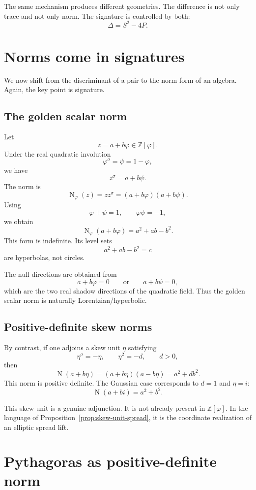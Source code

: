 \documentclass[11pt]{article}
\newcommand{\Nm}{\operatorname{N}}
\newcommand{\sig}{\sigma}
\newcommand{\ph}{\varphi}
\newcommand{\ps}{\psi}
\newcommand{\Z}{\mathbb{Z}}
\begin{document}
The same mechanism produces different geometries.  The difference is not only trace and not only norm.  The signature is controlled by both:
\[
    \Delta=S^2-4P.
\]

\section{Norms come in signatures}

We now shift from the discriminant of a pair to the norm form of an algebra.  Again, the key point is signature.

\subsection{The golden scalar norm}

Let
\[
    z=a+b\ph\in\Z[\ph].
\]
Under the real quadratic involution
\[
    \ph^\sig=\ps=1-\ph,
\]
we have
\[
    z^\sig=a+b\ps.
\]
The norm is
\[
    \Nm_\ph(z)=zz^\sig=(a+b\ph)(a+b\ps).
\]
Using
\[
    \ph+\ps=1,
    \qquad
    \ph\ps=-1,
\]
we obtain
\[
    \Nm_\ph(a+b\ph)=a^2+ab-b^2.
\]
This form is indefinite.  Its level sets
\[
    a^2+ab-b^2=c
\]
are hyperbolas, not circles.

The null directions are obtained from
\[
    a+b\ph=0
    \qquad\text{or}\qquad
    a+b\ps=0,
\]
which are the two real shadow directions of the quadratic field.  Thus the golden scalar norm is naturally Lorentzian/hyperbolic.

\subsection{Positive-definite skew norms}

By contrast, if one adjoins a skew unit $\eta$ satisfying
\[
    \eta^\sig=-\eta,
    \qquad
    \eta^2=-d,
    \qquad
    d>0,
\]
then
\[
    \Nm(a+b\eta)=(a+b\eta)(a-b\eta)=a^2+d b^2.
\]
This norm is positive definite.  The Gaussian case corresponds to $d=1$ and $\eta=i$:
\[
    \Nm(a+bi)=a^2+b^2.
\]

This skew unit is a genuine adjunction.  It is not already present in $\Z[\ph]$.  In the language of Proposition~\ref{prop:skew-unit-spread}, it is the coordinate realization of an elliptic spread lift.

\section{Pythagoras as positive-definite norm}
\end{document}
